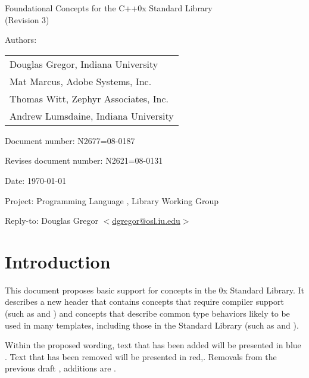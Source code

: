 \documentclass[american,twoside]{book}
\begin{document}
\raggedbottom

\begin{titlepage}
\begin{center}
\huge
Foundational Concepts for the C++0x Standard Library\\
(Revision 3)
\vspace{0.25in}
\end{center}

\normalsize
\vspace{0.25in}
\par\noindent Authors: 
\begin{tabular}[t]{l}
Douglas Gregor, Indiana University \\
Mat Marcus, Adobe Systems, Inc.\\
Thomas Witt, Zephyr Associates, Inc.\\
Andrew Lumsdaine, Indiana University
\end{tabular}\vspace{-6pt}

\par\noindent Document number: N2677=08-0187\vspace{-6pt}
\par\noindent Revises document number: N2621=08-0131\vspace{-6pt}
\par\noindent Date: \today\vspace{-6pt}
\par\noindent Project: Programming Language \Cpp{}, Library Working Group\vspace{-6pt}
\par\noindent Reply-to: Douglas Gregor $<$\href{mailto:dgregor@osl.iu.edu}{dgregor@osl.iu.edu}$>$\vspace{-6pt}

\section*{Introduction}
This document proposes basic support for concepts in the \Cpp0x
Standard Library. It describes a new header  that
contains concepts that require compiler support (such as
 and ) and concepts that describe
common type behaviors likely to be used in many templates, including
those in the Standard Library (such as  and
). 

Within the proposed wording, text that has been added
\textcolor{addclr}{will be presented in blue} . Text that has been removed will be
presented \textcolor{remclr}{in red},. Removals from the previous draft
, additions are
.


\end{titlepage}
\end{document}
